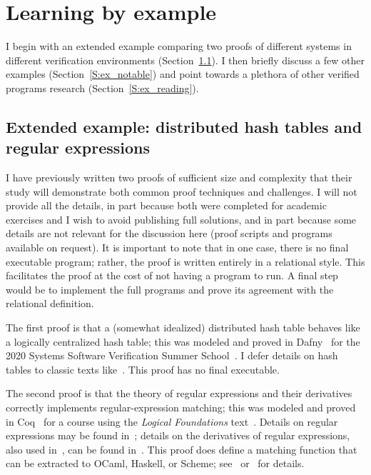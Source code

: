 \section{Learning by example}\label{S:examples}


I begin with an extended example comparing two proofs of different systems in
different verification environments (Section~\ref{S:ex_ext}). I then briefly
discuss a few other examples (Section~\ref{S:ex_notable}) and point towards a
plethora of other verified programs research (Section~\ref{S:ex_reading}).

\subsection{Extended example: distributed hash tables and regular
expressions}\label{S:ex_ext}

I have previously written two proofs of sufficient size and complexity that
their study will demonstrate both common proof techniques and challenges. I will
not provide all the details, in part because both were completed for academic
exercises and I wish to avoid publishing full solutions, and in part because
some details are not relevant for the discussion here (proof scripts and
programs available on request). It is important to note that in one case, there
is no final executable program; rather, the proof is written entirely in a
relational style. This facilitates the proof at the cost of not having a program
to run. A final step would be to implement the full programs and prove its
agreement with the relational definition.

The first proof is that a (somewhat idealized) distributed hash table behaves
like a logically centralized hash table; this was modeled and proved in
Dafny~\cite{leino2010dafny} for the 2020 Systems Software Verification Summer
School~\cite{Kapritsos_2020}. I defer details on hash tables to classic texts
like~\cite{CLRS}. This proof has no final executable.

The second proof is that the theory of regular expressions and their derivatives
correctly implements regular-expression matching; this was modeled and proved in
Coq~\cite{Coq} for a course using the \emph{Logical Foundations}
text~\cite{Pierce:SF1}. Details on regular expressions may be found
in~\cite{Lewis_1997,Morrisett_2012}; details on the derivatives of regular
expressions, also used in~\cite{Pierce:SF1,Morrisett_2012}, can be found
in~\cite{Might_Yacc,Might_desugar,Might_deriv}. This proof does define a
matching function that can be extracted to OCaml, Haskell, or Scheme;
see~\cite{Coq_Extract} or~\cite[Extraction]{Pierce:SF1} for details.

